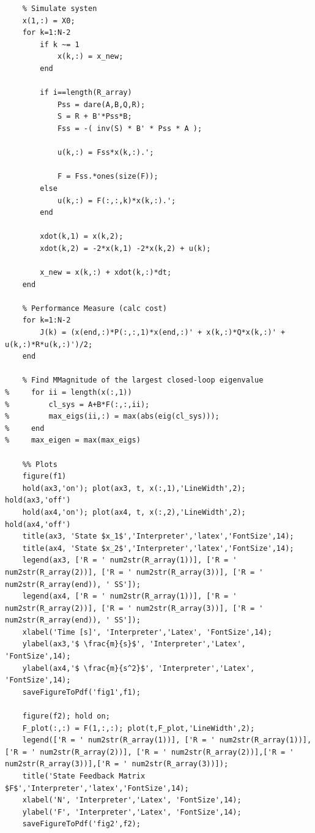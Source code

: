 \documentclass{article}
\begin{document}
\begin{lstlisting}
    % Simulate systen
    x(1,:) = X0;
    for k=1:N-2
        if k ~= 1
            x(k,:) = x_new;
        end
        
        if i==length(R_array)
            Pss = dare(A,B,Q,R);
            S = R + B'*Pss*B;
            Fss = -( inv(S) * B' * Pss * A );
            
            u(k,:) = Fss*x(k,:).';
            
            F = Fss.*ones(size(F));
        else
            u(k,:) = F(:,:,k)*x(k,:).';
        end

        xdot(k,1) = x(k,2);
        xdot(k,2) = -2*x(k,1) -2*x(k,2) + u(k); 

        x_new = x(k,:) + xdot(k,:)*dt;
    end
    
    % Performance Measure (calc cost)
    for k=1:N-2
        J(k) = (x(end,:)*P(:,:,1)*x(end,:)' + x(k,:)*Q*x(k,:)' + u(k,:)*R*u(k,:)')/2;
    end

    % Find MMagnitude of the largest closed-loop eigenvalue
%     for ii = length(x(:,1))
%         cl_sys = A+B*F(:,:,ii);
%         max_eigs(ii,:) = max(abs(eig(cl_sys)));
%     end
%     max_eigen = max(max_eigs)
               
    %% Plots
    figure(f1)
    hold(ax3,'on'); plot(ax3, t, x(:,1),'LineWidth',2); hold(ax3,'off')
    hold(ax4,'on'); plot(ax4, t, x(:,2),'LineWidth',2); hold(ax4,'off')
    title(ax3, 'State $x_1$','Interpreter','latex','FontSize',14); 
    title(ax4, 'State $x_2$','Interpreter','latex','FontSize',14);   
    legend(ax3, ['R = ' num2str(R_array(1))], ['R = ' num2str(R_array(2))], ['R = ' num2str(R_array(3))], ['R = ' num2str(R_array(end)), ' SS']);
    legend(ax4, ['R = ' num2str(R_array(1))], ['R = ' num2str(R_array(2))], ['R = ' num2str(R_array(3))], ['R = ' num2str(R_array(end)), ' SS']);
    xlabel('Time [s]', 'Interpreter','Latex', 'FontSize',14);
    ylabel(ax3,'$ \frac{m}{s}$', 'Interpreter','Latex', 'FontSize',14);
    ylabel(ax4,'$ \frac{m}{s^2}$', 'Interpreter','Latex', 'FontSize',14);
    saveFigureToPdf('fig1',f1);

    figure(f2); hold on; 
    F_plot(:,:) = F(1,:,:); plot(t,F_plot,'LineWidth',2);
    legend(['R = ' num2str(R_array(1))], ['R = ' num2str(R_array(1))], ['R = ' num2str(R_array(2))], ['R = ' num2str(R_array(2))],['R = ' num2str(R_array(3))],['R = ' num2str(R_array(3))]);
    title('State Feedback Matrix $F$','Interpreter','latex','FontSize',14); 
    xlabel('N', 'Interpreter','Latex', 'FontSize',14);
    ylabel('F', 'Interpreter','Latex', 'FontSize',14);
    saveFigureToPdf('fig2',f2);


\end{lstlisting}
\end{document}
